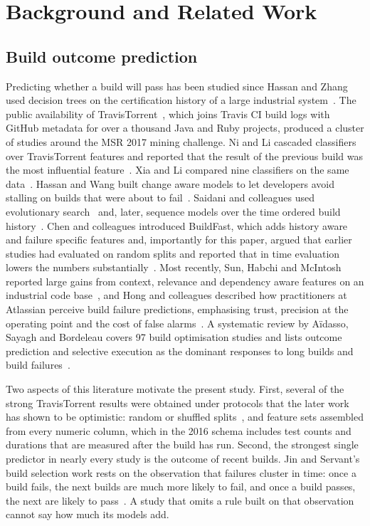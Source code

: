 \documentclass[sigconf,review,anonymous,nonacm]{acmart}
\begin{document}
\section{Background and Related Work}
\label{sec:related}

\subsection{Build outcome prediction}
\label{sec:related-prediction}

Predicting whether a build will pass has been studied since Hassan and Zhang used decision trees on the certification history of a large industrial system~\cite{hassan2006}. The public availability of TravisTorrent~\cite{beller2017travistorrent}, which joins Travis CI build logs with GitHub metadata for over a thousand Java and Ruby projects, produced a cluster of studies around the MSR 2017 mining challenge. Ni and Li cascaded classifiers over TravisTorrent features and reported that the result of the previous build was the most influential feature~\cite{nili2017}. Xia and Li compared nine classifiers on the same data~\cite{xiali2017}. Hassan and Wang built change aware models to let developers avoid stalling on builds that were about to fail~\cite{hassanwang2017}. Saidani and colleagues used evolutionary search~\cite{saidani2020} and, later, sequence models over the time ordered build history~\cite{saidani2022}. Chen and colleagues introduced BuildFast, which adds history aware and failure specific features and, importantly for this paper, argued that earlier studies had evaluated on random splits and reported that in time evaluation lowers the numbers substantially~\cite{chen2020buildfast}. Most recently, Sun, Habchi and McIntosh reported large gains from context, relevance and dependency aware features on an industrial code base~\cite{sun2024ravenbuild}, and Hong and colleagues described how practitioners at Atlassian perceive build failure predictions, emphasising trust, precision at the operating point and the cost of false alarms~\cite{hong2024atlassian}. A systematic review by A\"{i}dasso, Sayagh and Bordeleau covers 97 build optimisation studies and lists outcome prediction and selective execution as the dominant responses to long builds and build failures~\cite{aidasso2025slr}.

Two aspects of this literature motivate the present study. First, several of the strong TravisTorrent results were obtained under protocols that the later work has shown to be optimistic: random or shuffled splits~\cite{nili2017, xiali2017}, and feature sets assembled from every numeric column, which in the 2016 schema includes test counts and durations that are measured after the build has run. Second, the strongest single predictor in nearly every study is the outcome of recent builds. Jin and Servant's build selection work rests on the observation that failures cluster in time: once a build fails, the next builds are much more likely to fail, and once a build passes, the next are likely to pass~\cite{jin2020, jin2022}. A study that omits a rule built on that observation cannot say how much its models add.
\end{document}
